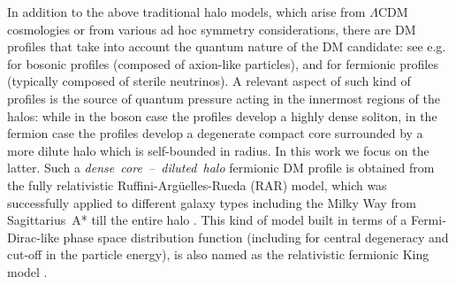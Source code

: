 \documentclass[twocolumn]{aa}
\begin{document}
In addition to the above traditional halo models, which arise from $\Lambda$CDM cosmologies or from various ad hoc symmetry considerations, there are DM profiles that take into account the quantum nature of the DM candidate: see e.g. \cite{2014NatPh..10..496S} for bosonic profiles (composed of axion-like particles), and \cite{2015MNRAS.451..622R,2015PhRvD..92l3527C,2021MNRAS.502.4227A} for fermionic profiles (typically composed of sterile neutrinos). A relevant aspect of such kind of profiles is the source of quantum pressure acting in the innermost regions of the halos: while in the boson case the profiles develop a highly dense soliton, in the fermion case the profiles develop a degenerate compact core surrounded by a more dilute halo which is self-bounded in radius. In this work we focus on the latter. Such a \emph{dense~core~--~diluted~halo} fermionic DM profile is obtained from the fully relativistic Ruffini-Argüelles-Rueda (RAR) model, which was successfully applied to different galaxy types \citep{2019PDU....24..278A,2023ApJ...945....1K} including the Milky Way from Sagittarius~A* till the entire halo \citep{arguelles_novel_2018,2020A&A...641A..34B,2021MNRAS.505L..64B,2022MNRAS.511L..35A}.
This kind of model built in terms of a Fermi-Dirac-like phase space distribution function (including for central degeneracy and cut-off in the particle energy), is also named as the relativistic fermionic King model \citep{2022PhRvD.106d3538C}.

\end{document}
